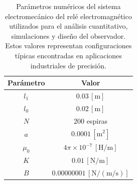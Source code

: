 \documentclass[
  11pt,
  letterpaper,
   addpoints,
   answers
  ]{exam}
\begin{document}
\begin{table}[h!]
  \centering
  \caption{Parámetros numéricos del sistema electromecánico del relé electromagnético utilizados para el análisis cuantitativo, simulaciones y diseño del observador. Estos valores representan configuraciones típicas encontradas en aplicaciones industriales de precisión.}
  \label{tab:parametros-numericos}
  \begin{tabular}{@{}c c@{}}
    \toprule
    \textbf{Parámetro} & \textbf{Valor} \\
    \midrule
    $l_1$ & $0.03\,[\mathrm{m}]$ \\
    $l_0$ & $0.02\,[\mathrm{m}]$ \\
    $N$   & $200$ espiras \\
    $a$   & $0.0001\,[\mathrm{m}^2]$ \\
    $\mu_0$ & $4\pi \times 10^{-7}\,[\mathrm{H/m}]$ \\
    $K$   & $0.01\,[\mathrm{N/m}]$ \\
    $B$   & $0.00000001\,[\mathrm{N/(m/s)}]$ \\
    \bottomrule
  \end{tabular}
\end{table}
\end{document}
